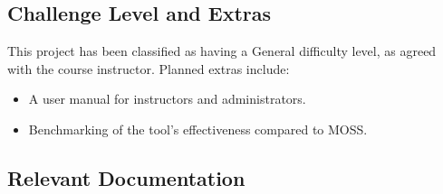\documentclass[12pt, titlepage]{article}
\begin{document}

\subsection{Challenge Level and Extras}



This project has been classified as having a General difficulty level, as agreed with the course instructor. 
Planned extras include:
\begin{itemize}
  \item A user manual for instructors and administrators.
  \item Benchmarking of the tool’s effectiveness compared to MOSS.
\end{itemize}

\subsection{Relevant Documentation}

\end{document}
